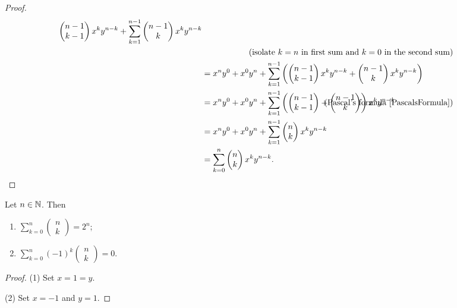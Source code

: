 \begin{proof}
\begin{align*}
\begin{pmatrix}
n-1 \\ k-1
\end{pmatrix}x^{k} y^{n-k} + \sum_{k=1}^{n-1} \begin{pmatrix}
n-1 \\ k
\end{pmatrix}x^{k} y^{n-k} \\
&&\hspace{-22em}\text{(isolate $k=n$ in first sum and $k=0$ in the second sum)}& \\
&= x^ny^{0} + x^0y^n + \sum_{k=1}^{n-1} \left(\begin{pmatrix}
n-1 \\ k-1
\end{pmatrix}x^{k} y^{n-k} + \begin{pmatrix}
n-1 \\ k
\end{pmatrix}x^{k} y^{n-k}\right) \\
&= x^ny^{0} + x^0y^n + \sum_{k=1}^{n-1} \left(\begin{pmatrix}
n-1 \\ k-1
\end{pmatrix} + \begin{pmatrix}
n-1 \\ k
\end{pmatrix}\right)x^{k} y^{n-k} &\hspace{-22em}\text{(Pascal's formula \ref{PascalsFormula})}& \\
&= x^ny^{0} + x^0y^n + \sum_{k=1}^{n-1} \begin{pmatrix}
n \\ k
\end{pmatrix}x^{k} y^{n-k} \\
&= \sum_{k=0}^{n} \begin{pmatrix}
n \\ k
\end{pmatrix}x^{k} y^{n-k}.
\end{align*}
\end{proof}
\begin{corollary} \label{consequencesBinomialIdentity}
Let $n\in \mathbb{N}$. Then
\begin{enumerate}
\item $\sum_{k=0}^n \begin{pmatrix}
n \\ k
\end{pmatrix} = 2^n$;
\item $\sum_{k=0}^n (-1)^k\begin{pmatrix}
n \\ k
\end{pmatrix} = 0$.
\end{enumerate}
\end{corollary}
\begin{proof}
(1) Set $x = 1 = y$.

(2) Set $x = -1$ and $y = 1$.
\end{proof}

